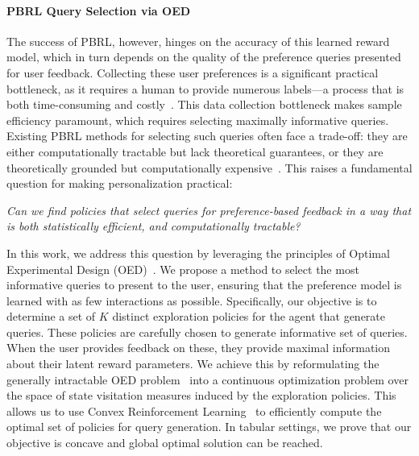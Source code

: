 \documentclass{article}
\begin{document}
\vspace{-0.2cm}   \paragraph{PBRL Query Selection via OED}
The success of PBRL, however, hinges on the accuracy of this learned reward model, which in turn depends on the quality of the preference queries presented for user feedback. Collecting these user preferences is a significant practical bottleneck, as it requires a human to provide numerous labels—a process that is both time-consuming and costly~\citep{ouyang2022traininglanguagemodelsfollow, lee2023aligningtexttoimagemodelsusing}. This data collection bottleneck makes sample efficiency paramount, which requires selecting maximally informative queries. Existing PBRL methods for selecting such queries often face a trade-off: they are either computationally tractable but lack theoretical guarantees, or they are theoretically grounded but computationally expensive~\citep{DBLP:journals/corr/abs-2111-04850, wu2023making, sadigh2017active, zhan2023provable, DBLP:journals/corr/abs-2111-04850}. This raises a fundamental question for making personalization practical:\vspace{-0.2cm}
\noindent\begin{center}
    \setlength{\fboxsep}{10pt}%
    \colorbox{gray!12}{%
        \parbox{0.75\linewidth}{\centering
        \emph{Can we find policies that select queries for preference-based feedback in a way that is both statistically efficient, and computationally tractable?}}
    }
\end{center}\vspace{-0.2cm}
In this work, we address this question by leveraging the principles of Optimal Experimental Design (OED)~\citep{chaloner1995bayesian, doi:10.1137/1.9780898719109, fedorov1997model}. We propose a method to select the most informative queries to present to the user, ensuring that the preference model is learned with as few interactions as possible. Specifically, our objective is to determine a set of $K$ distinct exploration policies for the agent that generate queries. These policies are carefully chosen to generate informative set of queries. When the user provides feedback on these, they provide maximal information about their latent reward parameters. We achieve this by reformulating the generally intractable OED problem~\citep{doi:10.1137/1.9780898719109, fedorov1997model} into a continuous optimization problem over the space of state visitation measures induced by the exploration policies. This allows us to use Convex Reinforcement Learning~\cite{hazan2019provably} to efficiently compute the optimal set of policies for query generation. In tabular settings, we prove that our objective is concave and global optimal solution can be reached.
\end{document}
